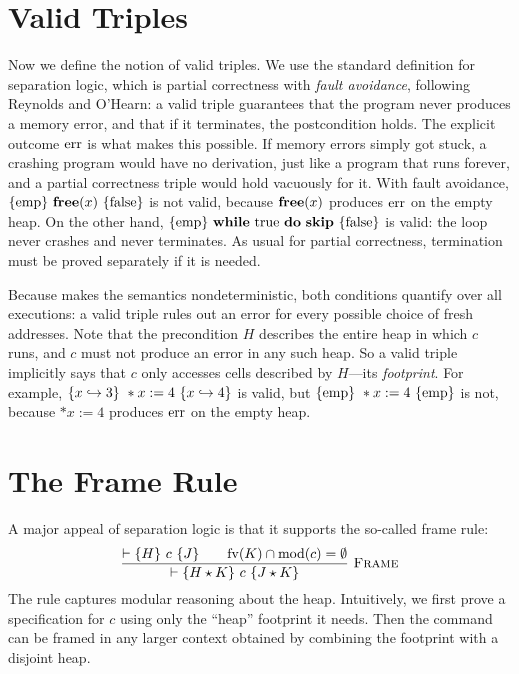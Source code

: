 \section{Valid Triples}
%
Now we define the notion of valid triples. We use the standard definition for separation logic,
which is partial correctness with \emph{fault avoidance}, following Reynolds and O'Hearn: a valid
triple guarantees that the program never produces a memory error, and that if it terminates, the
postcondition holds. The explicit outcome $\mathrm{err}$ is what makes this possible. If memory errors
simply got stuck, a crashing program would have no derivation, just like a program that runs
forever, and a partial correctness triple would hold vacuously for it. With fault avoidance,
$\{\mathrm{emp}\}\ \mathbf{free}(x)\ \{\mathrm{false}\}$ is not valid, because $\mathbf{free}(x)$ produces $\mathrm{err}$
on the empty heap. On the other hand, $\triple{\emp}{\kw{while}\ \mathrm{true}\ \kw{do}\ \kw{skip}}{\mathrm{false}}$
is valid: the loop never crashes and never terminates. As usual for partial correctness,
termination must be proved separately if it is needed.

Because  makes the semantics nondeterministic, both conditions quantify over all
executions: a valid triple rules out an error for every possible choice of fresh addresses.
%
Note that the precondition $H$ describes the entire heap in which $c$ runs, and $c$ must not
produce an error in any such heap. So a valid triple implicitly says that $c$ only accesses cells
described by $H$---its \emph{footprint}. For example, $\{x\hookrightarrow 3\}\ \ast x:=4\ \{x\hookrightarrow 4\}$ is
valid, but $\{\mathrm{emp}\}\ \ast x:=4\ \{\mathrm{emp}\}$ is not, because $\ast x:=4$ produces $\mathrm{err}$ on the
empty heap.
%
\section{The Frame Rule}
%
A major appeal of separation logic is that it supports the so-called frame rule:
\[
  \dfrac{\vdash\{H\}\ c\ \{J\}\qquad\mathrm{fv}(K)\cap\mathrm{mod}(c)=\emptyset}{\vdash\{H\mathbin{\star} K\}\ c\ \{J\mathbin{\star} K\}}\ \textsc{Frame}
\]
The rule captures modular reasoning about the heap. Intuitively, we first prove a specification for
$c$ using only the ``heap'' footprint it needs. Then the command can be framed in any larger
context obtained by combining the footprint with a disjoint heap.
%
